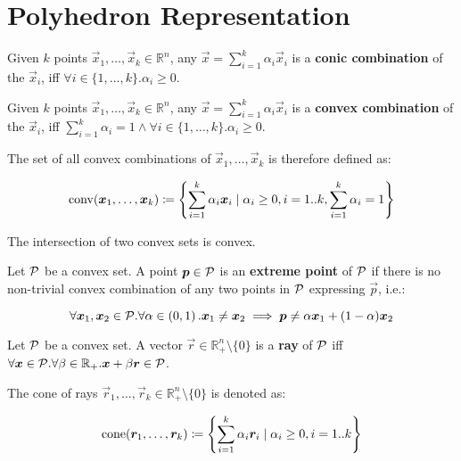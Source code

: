 \section{Polyhedron Representation}\label{sec:preliminaries_poly}
\begin{definition}
Given $k$ points $\vec{x}_1, \dots, \vec{x}_k \in \mathbb{R}^n$, any $\vec{x} = \sum_{i=1}^{k} \alpha_i \vec{x}_i$ is a \textbf{conic combination} of the $\vec{x}_i$, iff $\forall i \in \{1, \dots, k\}. \alpha_i \geq 0$.
\end{definition}

\begin{definition}\label{def:convex}
Given $k$ points $\vec{x}_1, \dots, \vec{x}_k \in \mathbb{R}^n$, any $\vec{x} = \sum_{i=1}^{k} \alpha_i \vec{x}_i$ is a \textbf{convex combination} of the $\vec{x}_i$, iff $\sum_{i=1}^{k} \alpha_i = 1 \land \forall i \in \{1, \dots, k\}. \alpha_i \geq 0$.

The set of all convex combinations of $\vec{x}_1, \dots, \vec{x}_k$ is therefore defined as:

\begin{equation*}
\operatorname{conv}({\bm{x}}_1, \dots, {\bm{x}}_k) \coloneqq \left\{\sum_{i=1}^{k} \alpha_i {\bm{x}}_i \mid \alpha_i \geq 0, i=1..k, \sum_{i=1}^{k} \alpha_i = 1\right\}
\end{equation*}
\end{definition}

\begin{corollary}\label{cor:intersection_convex}
The intersection of two convex sets is convex.
\end{corollary}

\begin{definition}
Let $\mathcal{P}$ be a convex set. A point ${\bm{p}} \in \mathcal{P}$ is an \textbf{extreme point} of $\mathcal{P}$ if there is no non-trivial convex combination of any two points in $\mathcal{P}$ expressing $\vec{p}$, i.e.:

\begin{equation*}
\forall {\bm{x}}_1, {\bm{x}}_2 \in \mathcal{P}. \forall \alpha \in \left(0,1 \right). {\bm{x}}_1 \neq {\bm{x}}_2 \implies {\bm{p}} \neq \alpha {\bm{x}}_1 + (1 - \alpha) {\bm{x}}_2
\end{equation*}
\end{definition}

\begin{definition}\label{def:rays}
Let $\mathcal{P}$ be a convex set. A vector $\vec{r} \in \mathbb{R}_+^n \setminus \{0\}$ is a \textbf{ray} of $\mathcal{P}$ iff $\forall {\bm{x}} \in \mathcal{P}. \forall \beta \in \mathbb{R}_+. {\bm{x}} + \beta {\bm{r}} \in \mathcal{P}$.

The cone of rays $\vec{r}_1, \dots, \vec{r}_k \in \mathbb{R}_+^n \setminus \{0\}$ is denoted as:

\begin{equation*}
\operatorname{cone}({\bm{r}}_1, \dots, {\bm{r}}_k) \coloneqq \left\{ \sum_{i=1}^{k} \alpha_i {\bm{r}}_i \mid \alpha_i \geq 0, i=1..k \right\}
\end{equation*}
\end{definition}

